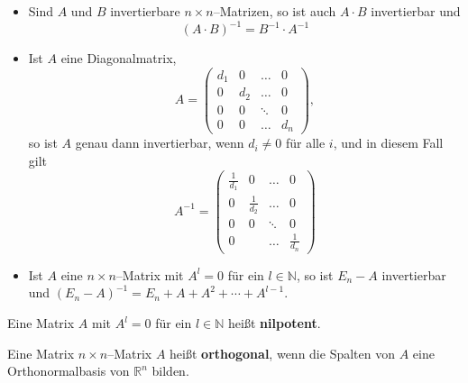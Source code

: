 \begin{regel} 

\begin{itemize} 
\item Sind $A$ und $B$ invertierbare $n \times n$--Matrizen, so ist auch $A \cdot B$ invertierbar und 
  $$ \left( A \cdot B \right)^{-1} = B^{-1} \cdot A^{-1} $$
\item Ist $A$ eine Diagonalmatrix, 
  $$ A = \left(\begin{matrix} d_1 & 0 & \ldots & 0 \\ 0 & d_2 & \ldots & 0 \\
     0 & 0 & \ddots & 0 \\ 0 & 0 & \ldots & d_n \end{matrix} \right),$$ 
so ist $A$ genau dann invertierbar, wenn $d_i \neq 0$ für 
alle $i$, und in diesem Fall gilt
  $$ A^{-1} = \left( \begin{matrix} \frac {1}{d_1} & 0 & \ldots & 0 \\ 0 & \frac {1}{d_2} & \ldots & 0 \\
     0 & 0 & \ddots & 0 \\ 0 &  & \ldots &  \frac {1}{d_n} \end{matrix} \right) $$
\item Ist $A$ eine $n \times n$--Matrix mit $A^l = 0$ für ein $l \in \mathbb N$, so ist $E_n - A$ invertierbar 
und $\left(E_n - A\right)^{-1} = E_n + A + A^2 + \cdots + A^{l-1} $.
\end{itemize}
\end{regel}


\begin{notiz} Eine Matrix $A$ mit $A^l = 0$ für ein $l \in \mathbb N$ heißt \textbf{nilpotent}.
\end{notiz}

\medbreak

\begin{definition} Eine Matrix $n \times n$--Matrix $A$ heißt \textbf{orthogonal}, 
wenn die Spalten von $A$ eine Orthonormalbasis von $\mathbb R^n$ bilden.
\end{definition}

